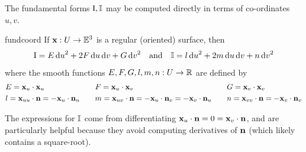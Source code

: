 \goodbreak

The fundamental forms $\mathrm{I},\mathbb{I}$ may be computed directly in terms of co-ordinates $u,v$.
 
\begin{thm}{}{fundcoord}
	If ${\mathbf{x}}:U\to\mathbb{E}^3$ is a regular (oriented) surface, then
	\[
		\mathrm{I}=E\,{\mathrm{d} u}^2+2F\,{\mathrm{d} u}\,{\mathrm{d} v}+G\,{\mathrm{d} v}^2\quad\text{and}\quad \mathbb{I} =l\,{\mathrm{d} u}^2+2m\,{\mathrm{d} u}\,{\mathrm{d} v}+n\,{\mathrm{d} v}^2
	\]
	where the smooth functions $E,F,G,l,m,n:U\to\mathbb{R}$ are defined by
	\begin{align*}
		&E={\mathbf{x}}_u\cdot{\mathbf{x}}_u &&F={\mathbf{x}}_u\cdot{\mathbf{x}}_v &&G={\mathbf{x}}_v\cdot{\mathbf{x}}_v\\
		&l={\mathbf{x}}_{uu}\cdot{\mathbf{n}} =-{\mathbf{x}}_u\cdot{\mathbf{n}}_u\quad &&m={\mathbf{x}}_{uv}\cdot{\mathbf{n}}=-{\mathbf{x}}_u\cdot{\mathbf{n}}_v=-{\mathbf{x}}_v\cdot{\mathbf{n}}_u\quad &&n={\mathbf{x}}_{vv}\cdot {\mathbf{n}}=-{\mathbf{x}}_v\cdot{\mathbf{n}}_v
	\end{align*}
\end{thm}

The expressions for $\mathbb{I}$ come from differentiating ${\mathbf{x}}_u\cdot{\mathbf{n}}=0={\mathbf{x}}_v\cdot{\mathbf{n}}$, and are particularly helpful because they avoid computing derivatives of ${\mathbf{n}}$ (which likely contains a square-root). 

